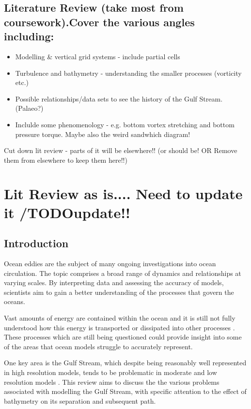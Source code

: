 \documentclass[a4paper,11pt]{article}
\begin{document}
\subsection{Literature Review (take most from coursework).Cover the various angles including:}
\begin{itemize}
  \item Modelling \& vertical grid systems - include partial cells
  \item Turbulence and bathymetry - understanding the smaller processes (vorticity etc.) \citep{Tansley2001} \citep{Nikurashin2012a}
  \item Possible relationships/data sets to see the history of the Gulf Stream. (Palaeo?) \citep{Ezer2015}
  \item Inclulde some phenomenology - e.g. bottom vortex stretching and bottom pressure torque. Maybe also the weird sandwhich diagram!
\end{itemize}

Cut down lit review - parts of it will be elsewhere!! (or should be! OR Remove them from elsewhere to keep them here!!)

\section{Lit Review as is.... Need to update it /TODO{update!!}}

\subsection{Introduction}
Ocean eddies are the subject of many ongoing investigations into ocean circulation. The topic comprises a broad range of dynamics and relationships at varying scales. By interpreting data and assessing the accuracy of models, scientists aim to gain a better understanding of the processes that govern the oceans.

Vast amounts of energy are contained within the ocean and it is still not fully understood how this energy is transported or dissipated into other processes \citep{Nikurashin2012a}. These processes which are still being questioned could provide insight into some of the areas that ocean models struggle to accurately represent.

One key area is the Gulf Stream, which despite being reasonably well represented in high resolution models, tends to be problematic in moderate and low resolution models \citep{Zhang2007}. This review aims to discuss the the various problems associated with modelling the Gulf Stream, with specific attention to the effect of bathymetry on its separation and subsequent path.
\end{document}
